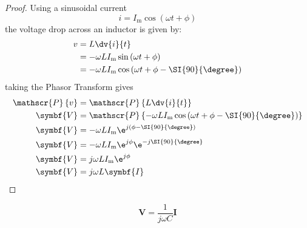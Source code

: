 \documentclass{article}
\begin{document}
\begin{proof}
    Using a sinusoidal current
    \begin{equation*}
        i = I_{\mathrm{m}}\cos{\left( \omega t + \phi \right)}
    \end{equation*}
    the voltage drop across an inductor is given by:
    \begin{align*}
        v & = L \dv{i}{t}                                                                      \\
          & = -\omega L I_{\mathrm{m}} \sin{\left( \omega t + \phi \right)}                    \\
          & = -\omega L I_{\mathrm{m}} \cos{\left( \omega t + \phi - \SI{90}{\degree} \right)}
    \end{align*}
    taking the Phasor Transform gives
    \begin{align*}
        \mathscr{P}\left\{ v \right\} & = \mathscr{P}\left\{ L \dv{i}{t} \right\}                                                                      \\
        \symbf{V}                     & = \mathscr{P}\left\{ -\omega L I_{\mathrm{m}} \cos{\left( \omega t + \phi - \SI{90}{\degree} \right)} \right\} \\
        \symbf{V}                     & = -\omega L I_{\mathrm{m}} \e^{j\left( \phi - \SI{90}{\degree} \right)}                                        \\
        \symbf{V}                     & = -\omega L I_{\mathrm{m}} \e^{j \phi} \e^{-j\SI{90}{\degree}}                                                 \\
        \symbf{V}                     & = j\omega L I_{\mathrm{m}} \e^{j \phi}                                                                         \\
        \symbf{V}                     & = j\omega L \symbf{I}
    \end{align*}
\end{proof}
\begin{theorem}
    \begin{equation*}
        \symbf{V} = \frac{1}{j\omega C}\symbf{I}
    \end{equation*}
\end{theorem}
\end{document}
